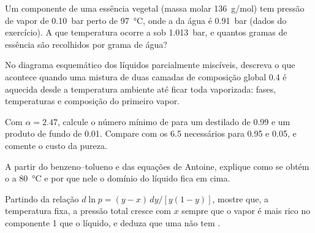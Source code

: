 \begin{exercise}[$\star\star$]\label{exo:b2:liquid-vapour-diagrams:8}
Um componente de uma essência vegetal (massa molar \qty{136}{g/mol}) tem
pressão de vapor de \qty{0.10}{bar} perto de \qty{97}{\degreeCelsius}, onde a
da água é \qty{0.91}{bar} (dados do exercício). A que temperatura ocorre a
 sob \qty{1.013}{bar}, e quantos gramas de
essência são recolhidos por grama de água?
\end{exercise}

\begin{exercise}[$\star\star$]\label{exo:b2:liquid-vapour-diagrams:9}
No diagrama esquemático dos líquidos parcialmente miscíveis, descreva o que
acontece quando uma mistura de duas camadas de composição global 0.4 é
aquecida desde a temperatura ambiente até ficar toda vaporizada: fases,
temperaturas e composição do primeiro vapor.
\end{exercise}

\begin{exercise}[$\star\star\star$]\label{exo:b2:liquid-vapour-diagrams:10}
Com $\alpha = 2.47$, calcule o número mínimo de  para um
destilado de 0.99 e um produto de fundo de 0.01. Compare com os 6.5
necessários para 0.95 e 0.05, e comente o custo da pureza.
\end{exercise}

\begin{exercise}[$\star\star\star$]\label{exo:b2:liquid-vapour-diagrams:11}
A partir do  benzeno--tolueno e das equações de Antoine,
explique como se obtém o  a \qty{80}{\degreeCelsius} e por
que nele o domínio do líquido fica em cima.
\end{exercise}

\begin{exercise}[$\star\star\star$]\label{exo:b2:liquid-vapour-diagrams:12}
Partindo da relação $d\ln p = (y - x)\,dy/[y(1 - y)]$, mostre que, a
temperatura fixa, a pressão total cresce com $x$ sempre que o vapor é mais
rico no componente 1 que o líquido, e deduza que uma  não tem
.
\end{exercise}

